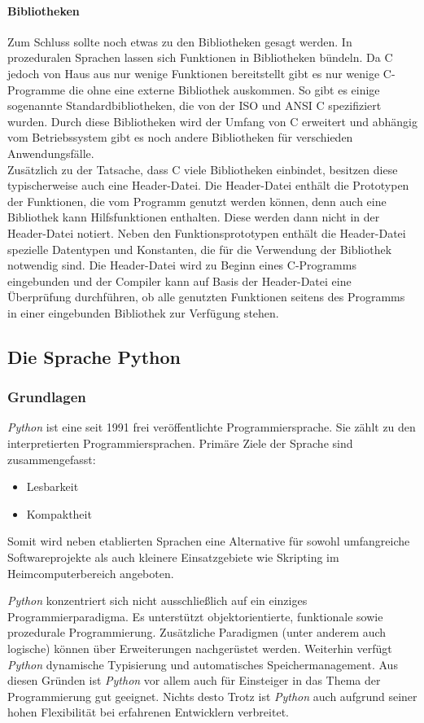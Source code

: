   \paragraph{Bibliotheken}
  Zum Schluss sollte noch etwas zu den Bibliotheken gesagt werden. In prozeduralen Sprachen lassen sich
  Funktionen in Bibliotheken bündeln. Da C jedoch von Haus aus nur wenige Funktionen bereitstellt gibt es
  nur wenige C-Programme die ohne eine externe Bibliothek auskommen. So gibt es einige sogenannte
  Standardbibliotheken, die von der ISO und ANSI C spezifiziert wurden. Durch diese
  Bibliotheken wird der Umfang von C erweitert und abhängig vom Betriebssystem gibt es noch andere
  Bibliotheken für verschieden Anwendungsfälle. \\
  Zusätzlich zu der Tatsache, dass C viele Bibliotheken einbindet, besitzen diese typischerweise auch
  eine Header-Datei. Die Header-Datei enthält die Prototypen der Funktionen, die vom Programm genutzt
  werden können, denn auch eine Bibliothek kann Hilfsfunktionen enthalten. Diese werden dann nicht in
  der Header-Datei notiert. Neben den Funktionsprototypen enthält die Header-Datei spezielle
  Datentypen und Konstanten, die für die Verwendung der Bibliothek notwendig sind. Die Header-Datei wird
  zu Beginn eines C-Programms eingebunden und der Compiler kann auf Basis der Header-Datei eine Überprüfung
  durchführen, ob alle genutzten Funktionen seitens des Programms in einer eingebunden Bibliothek zur
  Verfügung stehen.

\subsection{Die Sprache Python}
\subsubsection{Grundlagen}
\textit{Python} ist eine seit 1991 frei veröffentlichte Programmiersprache. Sie zählt
zu den interpretierten Programmiersprachen. Primäre Ziele der Sprache sind zusammengefasst:
\begin{itemize}
\item Lesbarkeit
\item Kompaktheit
\end{itemize}
Somit wird neben etablierten Sprachen eine Alternative für sowohl umfangreiche Softwareprojekte
als auch kleinere Einsatzgebiete wie Skripting im Heimcomputerbereich angeboten.

\textit{Python} konzentriert sich nicht ausschließlich auf ein einziges Programmierparadigma.
Es unterstützt objektorientierte, funktionale sowie prozedurale Programmierung. Zusätzliche
Paradigmen (unter anderem auch logische) können über Erweiterungen nachgerüstet werden.
Weiterhin verfügt \textit{Python} dynamische Typisierung und automatisches Speichermanagement. Aus
diesen Gründen ist \textit{Python} vor allem auch für Einsteiger in das Thema der Programmierung
gut geeignet. Nichts desto Trotz ist \textit{Python} auch aufgrund seiner hohen Flexibilität
bei erfahrenen Entwicklern verbreitet.

